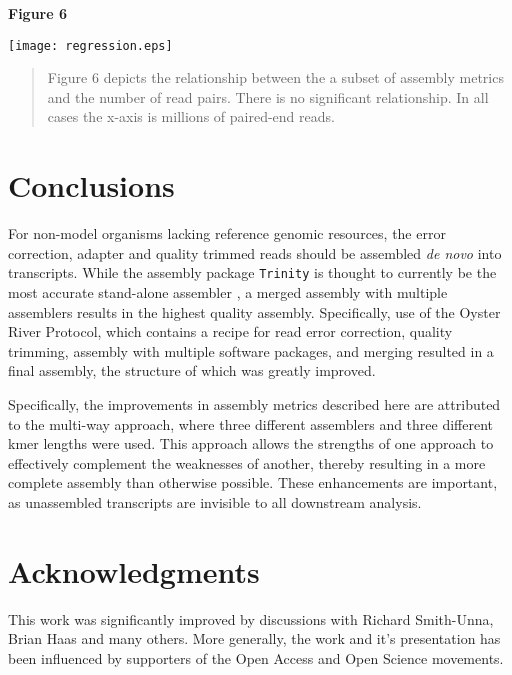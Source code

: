 \documentclass[10pt,letterpaper]{article}
\begin{document}
\textbf{\hypertarget{Figure 6}{Figure 6}} \\
\centerline{\texttt{[image: regression.eps]}}
\begin{quote}
\small{Figure 6 depicts the relationship between the a subset of assembly metrics and the number of read pairs. There is no significant relationship. In all cases the x-axis is millions of paired-end reads. }
\end{quote}

\section{Conclusions}

For non-model organisms lacking reference genomic resources, the error correction, adapter and quality trimmed reads should be assembled \textit{de novo} into transcripts. While the assembly package \texttt{Trinity} \citep{Haas:2013jq} is thought to currently be the most accurate stand-alone assembler \citep{Li:2014cm}, a merged assembly with multiple assemblers results in the highest quality assembly. Specifically, use of the Oyster River Protocol, which contains a recipe for read error correction, quality trimming, assembly with multiple software packages, and merging resulted in a final assembly, the structure of which was greatly improved. 

Specifically, the improvements in assembly metrics described here are attributed to the multi-way approach, where three different assemblers and three different kmer lengths were used. This approach allows the strengths of one approach to effectively complement the weaknesses of another, thereby resulting in a more complete assembly than otherwise possible. These enhancements are important, as unassembled transcripts are invisible to all downstream analysis.      
 


\section*{Acknowledgments}

This work was significantly improved by discussions with Richard Smith-Unna, Brian Haas and many others. More generally, the work and it's presentation has been influenced by supporters of the Open Access and Open Science movements. 


\end{document}
